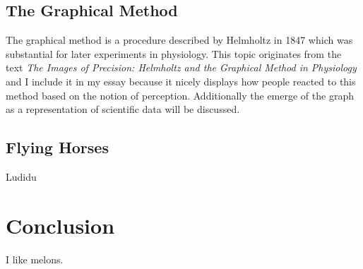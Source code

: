\documentclass[12pt,a4paper]{article}
\begin{document}
\subsection*{The Graphical Method}

The graphical method is a procedure described by Helmholtz in 1847 which was substantial for later
experiments in physiology. This topic originates from the text {\it{The Images of Precision: Helmholtz
and the Graphical Method in Physiology}} \cite{holmes} and I include it in my essay because
it nicely displays how people reacted to this method based on the notion of perception.
Additionally the emerge of the graph as a representation of scientific data will be discussed.

\subsection*{Flying Horses}

Ludidu

\section*{Conclusion}

I like melons.


\newpage



\end{document}
